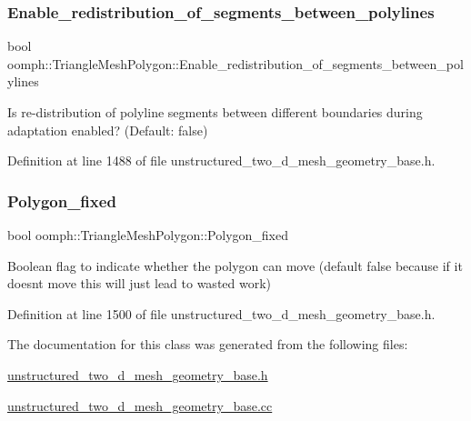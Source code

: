 \subsubsection{\texorpdfstring{Enable\+\_\+redistribution\+\_\+of\+\_\+segments\+\_\+between\+\_\+polylines}{Enable\_redistribution\_of\_segments\_between\_polylines}}
{\footnotesize\ttfamily bool oomph\+::\+Triangle\+Mesh\+Polygon\+::\+Enable\+\_\+redistribution\+\_\+of\+\_\+segments\+\_\+between\+\_\+polylines\hspace{0.3cm}{\ttfamily [protected]}}



Is re-\/distribution of polyline segments between different boundaries during adaptation enabled? (Default\+: false) 



Definition at line 1488 of file unstructured\+\_\+two\+\_\+d\+\_\+mesh\+\_\+geometry\+\_\+base.\+h.

\mbox{\label{classoomph_1_1TriangleMeshPolygon_a7f79fb03756524e23c8cc717c7c66f75}} 
\subsubsection{\texorpdfstring{Polygon\+\_\+fixed}{Polygon\_fixed}}
{\footnotesize\ttfamily bool oomph\+::\+Triangle\+Mesh\+Polygon\+::\+Polygon\+\_\+fixed\hspace{0.3cm}{\ttfamily [private]}}



Boolean flag to indicate whether the polygon can move (default false because if it doesn\textquotesingle{}t move this will just lead to wasted work) 



Definition at line 1500 of file unstructured\+\_\+two\+\_\+d\+\_\+mesh\+\_\+geometry\+\_\+base.\+h.



The documentation for this class was generated from the following files\+:\begin{DoxyCompactItemize}
\item 
\hyperlink{unstructured__two__d__mesh__geometry__base_8h}{unstructured\+\_\+two\+\_\+d\+\_\+mesh\+\_\+geometry\+\_\+base.\+h}\item 
\hyperlink{unstructured__two__d__mesh__geometry__base_8cc}{unstructured\+\_\+two\+\_\+d\+\_\+mesh\+\_\+geometry\+\_\+base.\+cc}\end{DoxyCompactItemize}
